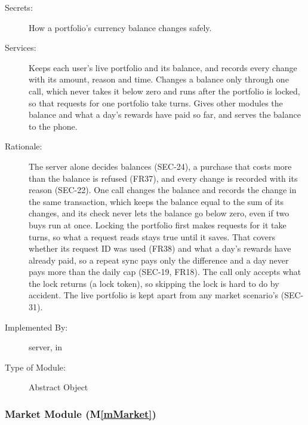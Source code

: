 \documentclass[12pt, titlepage]{article}
\newcommand{\mref}[1]{M\ref{#1}}
\begin{document}
\begin{description}
\item[Secrets:] How a portfolio's currency balance changes safely.
\item[Services:] Keeps each user's live portfolio and its balance, and records every change with its amount, reason and time. Changes a balance only through one call, which never takes it below zero and runs after the portfolio is locked, so that requests for one portfolio take turns. Gives other modules the balance and what a day's rewards have paid so far, and serves the balance to the phone.
\item[Rationale:] The server alone decides balances (SEC-24), a purchase that costs more than the balance is refused (FR37), and every change is recorded with its reason (SEC-22). One call changes the balance and records the change in the same transaction, which keeps the balance equal to the sum of its changes, and its check never lets the balance go below zero, even if two buys run at once. Locking the portfolio first makes requests for it take turns, so what a request reads stays true until it saves. That covers whether its request ID was used (FR38) and what a day's rewards have already paid, so a repeat sync pays only the difference and a day never pays more than the daily cap (SEC-19, FR18). The call only accepts what the lock returns (a lock token), so skipping the lock is hard to do by accident. The live portfolio is kept apart from any market scenario's (SEC-31).
\item[Implemented By:] \progname{} server, in 
\item[Type of Module:] Abstract Object
\end{description}

\subsubsection{Market Module (\mref{mMarket})}
\end{document}
